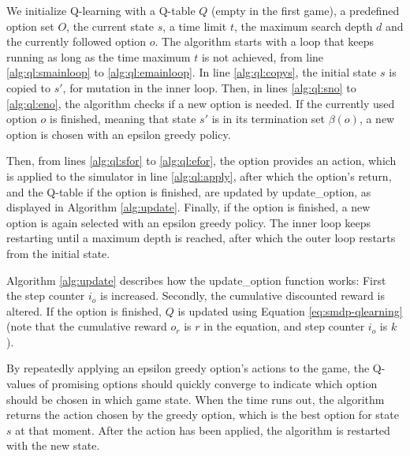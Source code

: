 We initialize Q-learning with a Q-table $Q$ (empty in the first game), a
predefined option set $O$, the current state $s$, a time limit $t$, the maximum
search depth $d$ and the currently followed option $o$. The algorithm starts
with a loop that keeps running as long as the time maximum $t$ is not achieved,
from line \ref{alg:ql:smainloop} to \ref{alg:ql:emainloop}. In line
\ref{alg:ql:copys}, the initial state $s$ is copied to $s'$, for mutation in the
inner loop. Then, in lines \ref{alg:ql:sno} to \ref{alg:ql:eno}, the algorithm
checks if a new option is needed. If the currently used option $o$ is finished,
meaning that state $s'$ is in its termination set $\beta(o)$, a new option is
chosen with an epsilon greedy policy. 

Then, from lines \ref{alg:ql:sfor} to \ref{alg:ql:efor}, the option provides an
action, which is applied to the simulator in line \ref{alg:ql:apply}, after
which the option's return, and the Q-table if the option is finished, are
updated by \textsf{update\_option}, as displayed in Algorithm \ref{alg:update}.
Finally, if the option is finished, a new option is again selected with an
epsilon greedy policy. The inner loop keeps restarting until a maximum depth is
reached, after which the outer loop restarts from the initial state.

Algorithm \ref{alg:update} describes how the \textsf{update\_option}
function works: First the step counter $i_o$ is increased. Secondly, the
cumulative discounted reward is altered. If the option is finished, $Q$ is
updated using Equation \ref{eq:smdp-qlearning} (note that the cumulative reward $o_r$
is $r$ in the equation, and step counter $i_o$ is $k$).

By repeatedly applying an epsilon greedy option's actions to the game, the
Q-values of promising options should quickly converge to indicate which option
should be chosen in which game state. When the time runs out, the algorithm
returns the action chosen by the greedy option, which is the best option for
state $s$ at that moment. After the action has been applied, the algorithm is
restarted with the new state. 
